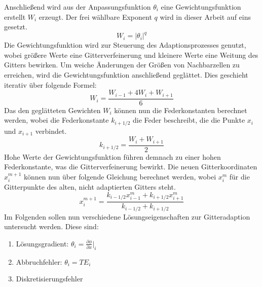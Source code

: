 Anschließend wird aus der Anpassungsfunktion $\theta_i$ eine Gewichtungsfunktion
erstellt $W_i$ erzeugt.
Der frei wählbare Exponent $q$ wird in dieser Arbeit auf eins gesetzt.
\begin{equation}
  W_i = \vert\theta_i \vert^q
\end{equation}
Die Gewichtungsfunktion wird zur Steuerung des Adaptionsprozesses genutzt, wobei größere
Werte eine Gitterverfeinerung und kleinere Werte eine Weitung des Gitters bewirken. Um
weiche Änderungen der Größen von Nachbarzellen zu erreichen, wird die Gewichtungsfunktion
anschließend geglättet. Dies geschieht iterativ über folgende Formel:
\begin{equation}
  W_i = \frac{W_{i-1} + 4W_i + W_{i+1}}{6}
\end{equation}
Das den geglätteten Gewichten $W_i$ können nun die Federkonstanten berechnet werden, wobei
die Federkonstante $k_{i+1/2}$ die Feder beschreibt, die die Punkte $x_{i}$ und $x_{i+1}$ verbindet.
\begin{equation}
  k_{i+1/2} = \frac{W_i + W_{i+1}}{2}
\end{equation}
Hohe Werte der Gewichtungsfunktion führen demnach zu einer hohen Federkonstante, was die
Gitterverfeinerung bewirkt. Die neuen Gitterkoordinaten $x_i^{m+1}$ können nun über folgende
Gleichung berechnet werden, wobei $x_i^m$ für die Gitterpunkte des alten, nicht adaptierten
Gitters steht.
\begin{equation}
  x_i^{m+1} = \frac{k_{i-1/2} x_{i-1}^m + k_{i+1/2} x_{i+1}^m}{k_{i-1/2} + k_{i+1/2}}
\end{equation}
Im Folgenden sollen nun verschiedene Lösungseigenschaften zur Gitteradaption untersucht werden.
Diese sind:
\begin{enumerate}
  \item Lösungsgradient: $\displaystyle\theta_i = \frac{\partial \phi}{\partial x}\bigg \vert_i$
  \item Abbruchfehler: $\theta_i = TE_i$
  \item Diskretisierungsfehler
\end{enumerate}
